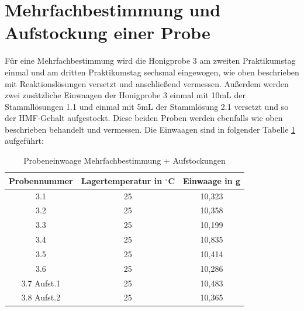 \section{Mehrfachbestimmung und Aufstockung einer Probe}

Für eine Mehrfachbestimmung wird die Honigprobe 3 am zweiten Praktikumstag einmal und am dritten Praktikumstag sechsmal eingewogen, wie oben beschrieben mit Reaktionslösungen versetzt und anschließend vermessen. Außerdem werden zwei zusätzliche Einwaagen der Honigprobe 3 einmal mit 10mL der Stammllösungen 1.1 und einmal mit 5mL der Stammlösung 2.1 versetzt und so der HMF-Gehalt aufgestockt. Diese beiden Proben werden ebenfalls wie oben beschrieben behandelt und vermessen. Die Einwaagen sind in folgender Tabelle \ref{tab:Probeneinwaage Mehrfachbestimmung + Aufstockungen} aufgeführt:
\begin{table}[htbp]
	\centering
	\caption{Probeneinwaage Mehrfachbestimmung + Aufstockungen}
		\begin{tabular}{c|c|c} 
			Probennummer & Lagertemperatur in $^\circ$C & Einwaage in g\\
			\hline
			3.1 & 25 & 10,323\\
			\hline
			3.2 & 25 & 10,358\\
			\hline
			3.3 & 25 & 10,199\\
			\hline
			3.4 & 25 & 10,835\\
			\hline
			3.5 & 25 & 10,414\\
			\hline
			3.6 & 25 & 10,286\\
			\hline
			3.7 Aufst.1 & 25 & 10,483\\
			\hline
			3.8 Aufst.2 & 25 & 10,365\\
		\end{tabular}
	\label{tab:Probeneinwaage Mehrfachbestimmung + Aufstockungen}
\end{table}
